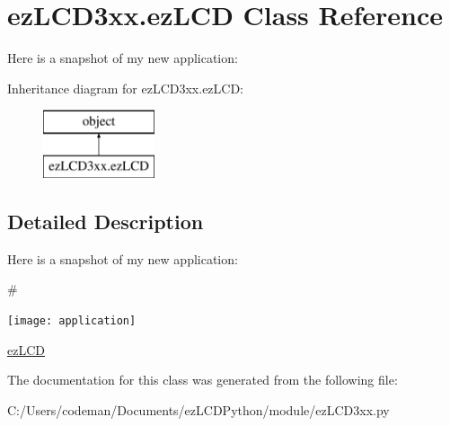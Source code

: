 \hypertarget{classez_l_c_d3xx_1_1ez_l_c_d}{\section{ez\-L\-C\-D3xx.\-ez\-L\-C\-D Class Reference}
\label{classez_l_c_d3xx_1_1ez_l_c_d}
}


Here is a snapshot of my new application\-:  


Inheritance diagram for ez\-L\-C\-D3xx.\-ez\-L\-C\-D\-:\begin{figure}[H]
\begin{center}
\leavevmode
\includegraphics[height=2.000000cm]{classez_l_c_d3xx_1_1ez_l_c_d}
\end{center}
\end{figure}


\subsection{Detailed Description}
Here is a snapshot of my new application\-: 

 \#
\begin{DoxyImage}
\texttt{[image: application]}
\caption{My application}
\end{DoxyImage}


\hyperlink{classez_l_c_d3xx_1_1ez_l_c_d}{ez\-L\-C\-D} 

The documentation for this class was generated from the following file\-:\begin{DoxyCompactItemize}
\item 
C\-:/\-Users/codeman/\-Documents/ez\-L\-C\-D\-Python/module/ez\-L\-C\-D3xx.\-py\end{DoxyCompactItemize}
